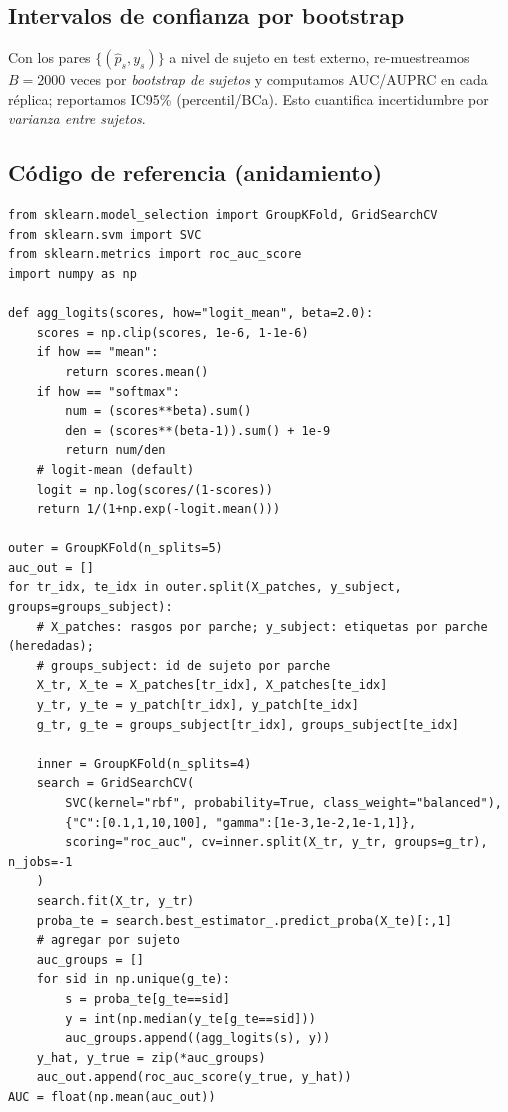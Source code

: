 \subsection{Intervalos de confianza por bootstrap}
Con los pares $\{(\hat{p}_s,y_s)\}$ a nivel de sujeto en test externo, re-muestreamos $B=2000$ veces por \emph{bootstrap de sujetos} y computamos AUC/AUPRC en cada réplica; reportamos IC95\% (percentil/BCa). Esto cuantifica incertidumbre por \emph{varianza entre sujetos}.

\subsection{Código de referencia (anidamiento)}
\begin{verbatim}
from sklearn.model_selection import GroupKFold, GridSearchCV
from sklearn.svm import SVC
from sklearn.metrics import roc_auc_score
import numpy as np

def agg_logits(scores, how="logit_mean", beta=2.0):
    scores = np.clip(scores, 1e-6, 1-1e-6)
    if how == "mean":
        return scores.mean()
    if how == "softmax":
        num = (scores**beta).sum()
        den = (scores**(beta-1)).sum() + 1e-9
        return num/den
    # logit-mean (default)
    logit = np.log(scores/(1-scores))
    return 1/(1+np.exp(-logit.mean()))

outer = GroupKFold(n_splits=5)
auc_out = []
for tr_idx, te_idx in outer.split(X_patches, y_subject, groups=groups_subject):
    # X_patches: rasgos por parche; y_subject: etiquetas por parche (heredadas);
    # groups_subject: id de sujeto por parche
    X_tr, X_te = X_patches[tr_idx], X_patches[te_idx]
    y_tr, y_te = y_patch[tr_idx], y_patch[te_idx]
    g_tr, g_te = groups_subject[tr_idx], groups_subject[te_idx]

    inner = GroupKFold(n_splits=4)
    search = GridSearchCV(
        SVC(kernel="rbf", probability=True, class_weight="balanced"),
        {"C":[0.1,1,10,100], "gamma":[1e-3,1e-2,1e-1,1]},
        scoring="roc_auc", cv=inner.split(X_tr, y_tr, groups=g_tr), n_jobs=-1
    )
    search.fit(X_tr, y_tr)
    proba_te = search.best_estimator_.predict_proba(X_te)[:,1]
    # agregar por sujeto
    auc_groups = []
    for sid in np.unique(g_te):
        s = proba_te[g_te==sid]
        y = int(np.median(y_te[g_te==sid]))
        auc_groups.append((agg_logits(s), y))
    y_hat, y_true = zip(*auc_groups)
    auc_out.append(roc_auc_score(y_true, y_hat))
AUC = float(np.mean(auc_out))
\end{verbatim}

